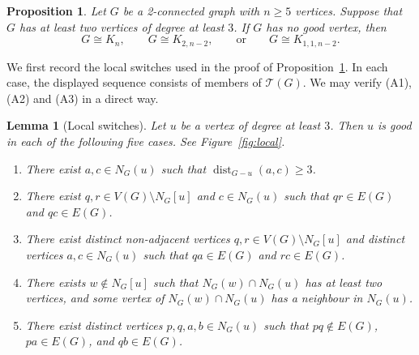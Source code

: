 \documentclass[11pt,a4paper]{amsart}
\newtheorem{proposition}[theorem]{Proposition}
\newtheorem{lemma}[theorem]{Lemma}
\theoremstyle{definition}
\theoremstyle{remark}
\newcommand{\Tc}{{\mathcal T}}
\newcommand{\dist}{\operatorname{dist}}
\begin{document}
{\begin{proposition}\label{prop:transition-classification}
Let $G$ be a 2-connected graph with $n\ge 5$ vertices.  Suppose that $G$ has
at least two vertices of degree at least $3$.  If $G$ has no good vertex, then
\[G\cong K_n,\qquad G\cong K_{2,n-2},\qquad\text{or}\qquad G\cong K_{1,1,n-2}.\]
\end{proposition}

We first record the local switches used in the proof of Proposition~\ref{prop:transition-classification}. 
In each case, the displayed sequence consists of members of $\Tc(G)$. We may verify (A1), (A2) and (A3) in a direct way. 
\begin{lemma}[Local switches]\label{lem:local-switches}
Let $u$ be a vertex of degree at least $3$. Then $u$ is good in each of the following five cases. See Figure~\ref{fig:local}. 
\begin{enumerate}[label=\textup{(\alph*)}]
\item There exist $a,c\in N_G(u)$ such that $\dist_{G - u}(a,c)\ge 3$.
\item There exist $q,r\in V(G)\setminus N_G[u]$ and $c\in N_G(u)$ such that $qr\in E(G)$ and $qc\in E(G)$.
\item There exist distinct non-adjacent vertices $q,r\in V(G)\setminus N_G[u]$ and distinct vertices $a,c\in N_G(u)$ such that $qa\in E(G)$ and $rc\in E(G)$.
\item There exists $w\notin N_G[u]$ such that $N_G(w)\cap N_G(u)$ has at least two vertices, and some vertex of $N_G(w)\cap N_G(u)$ has a neighbour in $N_G(u)$.
\item There exist distinct vertices $p,q,a,b\in N_G(u)$ such that $pq\notin E(G)$, $pa\in E(G)$, and $qb\in E(G)$. 
\end{enumerate}
\end{lemma}
\begin{figure}[htbp]
\centering
{}
\end{figure}}
\end{document}
